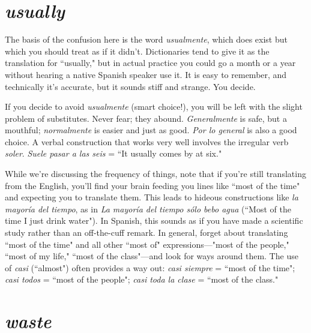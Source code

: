 \section{\emph{usually}}

The basis of the confusion here is the word \emph{usualmente},
which does exist but which you should treat as if it didn't. Dictionaries tend to give it as the translation for ``usually," but in actual practice you could go a month or a year without hearing a native Spanish
speaker use it. It is easy to remember, and technically it's accurate, but
it sounds stiff and strange. You decide.

If you decide to avoid \emph{usualmente} (smart choice!), you will be
left with the slight problem of substitutes. Never fear; they abound.
\emph{Generalmente} is safe, but a mouthful; \emph{normalmente} is easier and just
as good. \emph{Por lo general} is also a good choice. A verbal construction that
works very well involves the irregular verb \emph{soler}. \emph{Suele pasar a las seis}
= ``It usually comes by at six."

While we're discussing the frequency of things, note that if
you're still translating from the English, you'll find your brain feeding
you lines like ``most of the time" and expecting you to translate them.
This leads to hideous constructions like \emph{la mayoría del tiempo}, as in
\emph{La mayoría del tiempo sólo bebo agua} (``Most of the time I just drink
water"). In Spanish, this sounds as if you have made a scientific study
rather than an off-the-cuff remark. In general, forget about translating
``most of the time" and all other ``most of" expressions---"most of the
people," ``most of my life," ``most of the class"---and look for ways
around them. The use of \emph{casi} (``almost") often provides a way out: \emph{casi
siempre} = ``most of the time"; \emph{casi todos} = ``most of the people";
\emph{casi toda la clase} = ``most of the class."

\section{\emph{waste}}

